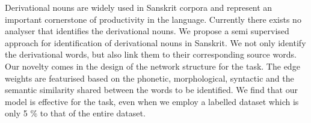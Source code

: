 Derivational nouns are widely used in Sanskrit corpora and represent an important cornerstone of productivity in the language. Currently there exists no analyser that identifies the derivational nouns. We propose a semi supervised approach for identification of derivational nouns in Sanskrit. We not only identify the derivational words, but also link them to their corresponding source words. Our novelty comes in the design of the network structure for the task. The edge weights are featurised based on the phonetic, morphological, syntactic and the semantic similarity shared between the words to be identified. We find that our model is effective for the task, even when we employ a labelled dataset which is only 5 \% to that of the entire dataset.
